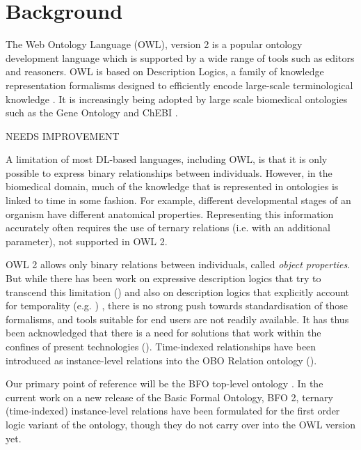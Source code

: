 \documentclass[10pt]{bmc_article}
\newenvironment{bmcformat}{\baselineskip20pt\sloppy\setboolean{publ}{false}}{\baselineskip20pt\sloppy}
\begin{document}
\begin{bmcformat}
\section*{Background}


The Web Ontology Language (OWL), version 2 \cite{grau2008} is a popular ontology 
development language which is supported by a wide range of tools
such as editors and reasoners. OWL is based on Description Logics, a family of 
knowledge representation formalisms designed to efficiently encode large-scale
terminological knowledge \cite{baader2003dlhandbook}. 
It is increasingly being adopted by large scale biomedical
ontologies such as the Gene Ontology \cite{go2000} and ChEBI \cite{chebinar2013}. 

NEEDS IMPROVEMENT

A limitation of most DL-based languages, including OWL, is that it is only possible to 
express binary relationships between individuals. However, in the biomedical domain,
much of the knowledge that is represented in ontologies is linked to time in some fashion. 
For example, different developmental stages of an organism have different anatomical properties. 
Representing this information accurately often requires the use of ternary relations (i.e. with an 
additional parameter), not supported in OWL 2. 

OWL 2 allows only binary relations between individuals, called
\emph{object properties}. But while there has been work on expressive description
logics that try to transcend this limitation (\cite{Calvanese:1997}) and also on description logics
that explicitly account for temporality (e.g. \cite{Wolter:2001}) , there is no strong push
towards standardisation of those formalisms, and tools suitable for end users
are not readily available. It has thus been acknowledged that there is a need
for solutions that work within the confines of present technologies
(\cite{Welty:2006}).
Time-indexed relationships have been introduced as instance-level relations into
the OBO Relation ontology (\cite{OBO:RO}). 

Our primary point of reference will be the BFO top-level ontology \cite{BFO2:Graz}. 
In the current work on a new release of the Basic
Formal Ontology, BFO 2, ternary (time-indexed) instance-level relations have
been formulated for the first order logic variant of the ontology, though they
do not carry over into the OWL version yet.


\end{bmcformat}
\end{document}
